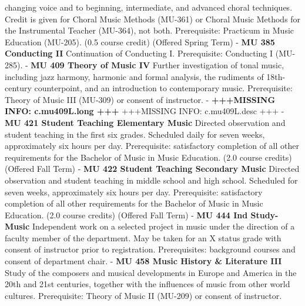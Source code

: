 \documentclass[
  letterpaper,
]{scrbook}
\begin{document}
changing voice and to beginning, intermediate, and advanced choral
techniques. Credit is given for Choral Music Methods (MU-361) or Choral
Music Methods for the Instrumental Teacher (MU-364), not both.
Prerequisite: Practicum in Music Education (MU-205). (0.5 course credit)
(Offered Spring Term) - \textbf{MU 385 Conducting II} Continuation of
Conducting I. Prerequisite: Conducting I (MU-285). - \textbf{MU 409
Theory of Music IV} Further investigation of tonal music, including jazz
harmony, harmonic and formal analysis, the rudiments of 18th-century
counterpoint, and an introduction to contemporary music. Prerequisite:
Theory of Music III (MU-309) or consent of instructor. -
\textbf{+++MISSING INFO: c.mu409L.long +++} +++MISSING INFO:
c.mu409L.desc +++ - \textbf{MU 421 Student Teaching Elementary Music}
Directed observation and student teaching in the first six grades.
Scheduled daily for seven weeks, approximately six hours per day.
Prerequisite: satisfactory completion of all other requirements for the
Bachelor of Music in Music Education. (2.0 course credits) (Offered Fall
Term) - \textbf{MU 422 Student Teaching Secondary Music} Directed
observation and student teaching in middle school and high school.
Scheduled for seven weeks, approximately six hours per day.
Prerequisite: satisfactory completion of all other requirements for the
Bachelor of Music in Music Education. (2.0 course credits) (Offered Fall
Term) - \textbf{MU 444 Ind Study-Music} Independent work on a selected
project in music under the direction of a faculty member of the
department. May be taken for an X status grade with consent of
instructor prior to registration. Prerequisites: background courses and
consent of department chair. - \textbf{MU 458 Music History \&
Literature III} Study of the composers and musical developments in
Europe and America in the 20th and 21st centuries, together with the
influences of music from other world cultures. Prerequisite: Theory of
Music II (MU-209) or consent of instructor.
\end{document}
